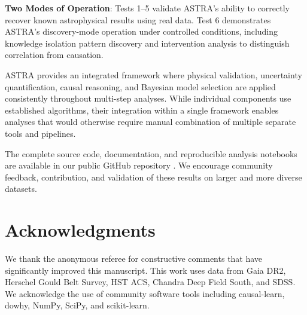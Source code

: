 \documentclass[usenatbib]{rasti}
\begin{document}
\textbf{Two Modes of Operation}: Tests 1--5 validate ASTRA's ability to correctly recover known astrophysical results using real data. Test 6 demonstrates ASTRA's discovery-mode operation under controlled conditions, including knowledge isolation pattern discovery and intervention analysis to distinguish correlation from causation.

ASTRA provides an integrated framework where physical validation, uncertainty quantification, causal reasoning, and Bayesian model selection are applied consistently throughout multi-step analyses. While individual components use established algorithms, their integration within a single framework enables analyses that would otherwise require manual combination of multiple separate tools and pipelines.

The complete source code, documentation, and reproducible analysis notebooks are available in our public GitHub repository \cite{astra_github}. We encourage community feedback, contribution, and validation of these results on larger and more diverse datasets.

\section*{Acknowledgments}

We thank the anonymous referee for constructive comments that have significantly improved this manuscript. This work uses data from Gaia DR2, Herschel Gould Belt Survey, HST ACS, Chandra Deep Field South, and SDSS. We acknowledge the use of community software tools including causal-learn, dowhy, NumPy, SciPy, and scikit-learn.

\label{lastpage}



\end{document}
